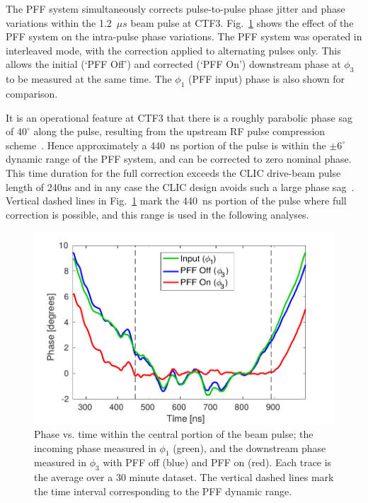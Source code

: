 \documentclass[%
 reprint,
 superscriptaddress,
 amsmath,
 amssymb,
 prl,
]{revtex4-1}
\begin{document}
The PFF system simultaneously corrects pulse-to-pulse phase jitter and phase 
variations within the 1.2~\(\mu s\) beam pulse at CTF3. 
Fig.~\ref{fig:shape} shows the effect of the PFF system on the intra-pulse 
phase variations. The PFF system was operated in interleaved mode, with 
the correction applied to alternating pulses only. This allows 
the initial (`PFF Off') and corrected (`PFF On') downstream phase at \(\phi_3\)
to be measured at the same time. The \(\phi_1\) (PFF input) phase 
is also shown for comparison. 

It is an operational feature at CTF3 that there is a roughly parabolic phase 
sag of \(40^\circ\) along the pulse, resulting from the upstream RF pulse 
compression 
scheme~\cite{CLICCDR}. Hence approximately a 440~ns portion of the pulse is 
within the \(\pm 6^\circ\) dynamic range of the PFF system, and can be 
corrected to zero nominal phase. 
This time duration for the full correction exceeds the CLIC drive-beam pulse 
length of 240ns and in any case the CLIC design avoids such 
a large phase sag~\cite{CLICCDR}. 
Vertical dashed lines in Fig.~\ref{fig:shape} mark the 440~ns portion of 
the pulse where full correction is possible, and this range is used in the 
following analyses. 

\begin{figure}
	\includegraphics[width=\columnwidth]{fig6}
	\caption{\label{fig:shape}Phase vs. time within the central portion of the  
	beam pulse; the incoming phase measured in \(\phi_1\) 
	(green), and the downstream phase measured in \(\phi_3\) with PFF off 
	(blue) and PFF on (red). Each trace is the average over a 30 minute dataset.
	The vertical dashed lines mark the time interval corresponding to the PFF 
	dynamic range. }
\end{figure}
\end{document}
